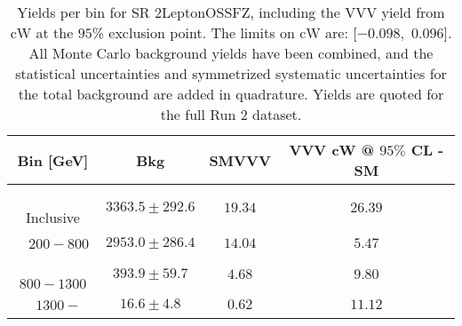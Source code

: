 \begin{table}[!htbp]
    \small
    \center
    \begin{tabular}{c||c|c|c}
    Bin [GeV] & Bkg & SMVVV & \pbox{20cm}{VVV \\ cW @ $95\%$ CL - SM \\ }\\
    \hline
    \pbox{20cm}{ ~ \\Inclusive\\ } & $3363.5 \pm 292.6$ & $19.34$ & $26.39$\\
    \hline
    \pbox{20cm}{ ~ \\$200-800$\\ } & $2953.0 \pm 286.4$ & $14.04$ & $5.47$\\
    \hline
    \pbox{20cm}{ ~ \\$800-1300$\\ } & $393.9 \pm 59.7$ & $4.68$ & $9.80$\\
    \hline
    \pbox{20cm}{ ~ \\$1300-$\\ } & $16.6 \pm 4.8$ & $0.62$ & $11.12$\\
\end{tabular}
    \caption{Yields per bin for SR 2LeptonOSSFZ, including the VVV yield from cW at the $95$\% exclusion point. The limits on cW are: [$-0.098$,~$0.096$]. All Monte Carlo background yields have been combined, and the statistical uncertainties and symmetrized systematic uncertainties for the total background are added in quadrature. Yields are quoted for the full Run 2 dataset.}
    \label{tab:2LeptonOSSFZ$binssignal}
\end{table}
